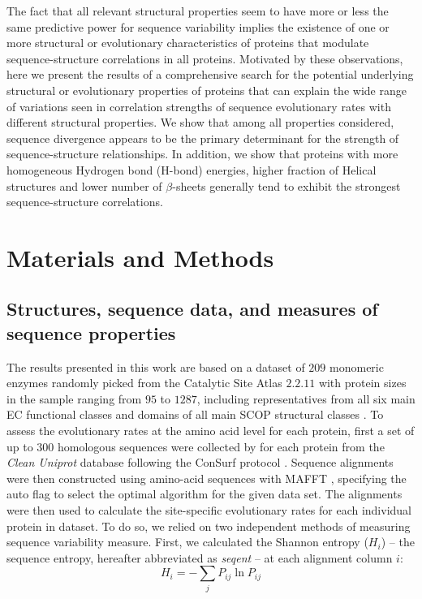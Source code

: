 \documentclass[12pt]{article}
\begin{document}
\indent The fact that all relevant structural properties seem to have more or less the same predictive power for sequence variability implies the existence of one or more structural or evolutionary characteristics of proteins that modulate sequence-structure correlations in all proteins. Motivated by these observations, here we present the results of a comprehensive search for the potential underlying structural or evolutionary properties of proteins that can explain the wide range of variations seen in correlation strengths of sequence evolutionary rates with different structural properties.  We show that among all properties considered, sequence divergence appears to be the primary determinant for the strength of sequence-structure relationships. In addition, we show that proteins with more homogeneous Hydrogen bond (H-bond) energies, higher fraction of Helical structures and lower number of $\beta$-sheets generally tend to exhibit the strongest sequence-structure correlations.  \\

\section{Materials and Methods}
\label{sec:mam}

    \subsection*{Structures, sequence data, and measures of sequence properties } 
    The results presented in this work are based on a dataset of $209$ monomeric enzymes \citep{Echaveetal2015} randomly picked from the Catalytic Site Atlas $2.2.11$ \citep{Porteretal2004} with protein sizes in the sample ranging from $95$ to $1287$, including representatives from all six main EC functional classes \citep{Webb1992} and domains of all main SCOP structural classes \citep{Murzinetal1995}. To assess the evolutionary rates at the amino acid level for each protein, first a set of up to $300$ homologous sequences were collected by \citep{Yehetal2014, Huangetal2014} for each protein from the {\it Clean Uniprot} database following the ConSurf protocol \citep{Goldenbergetal2008}. Sequence alignments were then constructed using amino-acid sequences with MAFFT \citep{Katohetal2002, Katohetal2005}, specifying the auto flag to select the optimal algorithm for the given data set. The alignments were then used to calculate the site-specific evolutionary rates for each individual protein in dataset. To do so, we relied on two independent methods of measuring sequence variability measure. First, we calculated the Shannon entropy ($H_i$) -- the sequence entropy, hereafter abbreviated as {\it seqent} -- at each alignment column $i$:
    \begin{equation}
        \label{eqn:shannon}
        H_i = -\sum_j P_{ij}\ln P_{ij}
    \end{equation}
\end{document}
